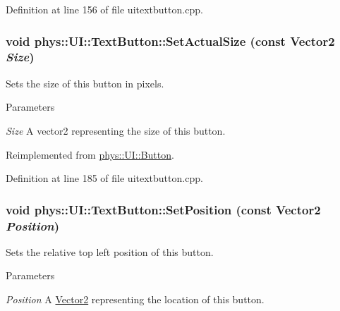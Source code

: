 Definition at line 156 of file uitextbutton.cpp.

\hypertarget{classphys_1_1UI_1_1TextButton_a7ed2be5c895c7fe01d7650746ccc57e9}{
\subsubsection[{SetActualSize}]{\setlength{\rightskip}{0pt plus 5cm}void phys::UI::TextButton::SetActualSize (const {\bf Vector2} {\em Size})}}
\label{df/d03/classphys_1_1UI_1_1TextButton_a7ed2be5c895c7fe01d7650746ccc57e9}


Sets the size of this button in pixels. 


\begin{DoxyParams}{Parameters}
\item[{\em Size}]A vector2 representing the size of this button. \end{DoxyParams}


Reimplemented from \hyperlink{classphys_1_1UI_1_1Button_a7ac62ddb9f40a701e80a4eccacdc7ea0}{phys::UI::Button}.



Definition at line 185 of file uitextbutton.cpp.

\hypertarget{classphys_1_1UI_1_1TextButton_acf40fd3a8382cdfc959d078e99f6ff0b}{
\subsubsection[{SetPosition}]{\setlength{\rightskip}{0pt plus 5cm}void phys::UI::TextButton::SetPosition (const {\bf Vector2} {\em Position})}}
\label{df/d03/classphys_1_1UI_1_1TextButton_acf40fd3a8382cdfc959d078e99f6ff0b}


Sets the relative top left position of this button. 


\begin{DoxyParams}{Parameters}
\item[{\em Position}]A \hyperlink{classphys_1_1Vector2}{Vector2} representing the location of this button. \end{DoxyParams}


